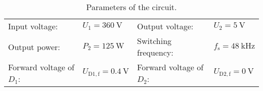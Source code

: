 
\begin{table}[htb]
    \centering  %
    \begin{tabular}{llll}
        \toprule
        Input voltage: &  $U_{\mathrm{1}} = \SI{360}{\volt}$ & Output voltage: & $U_{\mathrm{2}} = \SI{5}{\volt}$ \\ 
        Output power: & $P_{\mathrm{2}} = \SI{125}{\watt}$ & Switching frequency: & $f_{\mathrm{s}} = \SI{48}{\kilo\hertz}$ \\
        Forward voltage of $D_{\mathrm{1}}$: & $U_{\mathrm{D1,f}} = \SI{0.4}{\volt}$ & Forward voltage of $D_{\mathrm{2}}$: & $U_{\mathrm{D2,f}} = \SI{0}{\volt}$  \\
        \bottomrule
    \end{tabular}
    \caption{Parameters of the circuit.}  %
    \label{table:Ex04_Parameters of the singled ended forward converter.}
\end{table}
